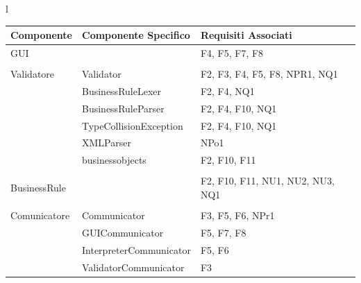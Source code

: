 \documentclass[11pt,titlepage,a4paper]{report}
\begin{document}
\begin{center}
\begin{table}[hbtp]
\large{
\begin{tabular}{l}
\begin{tabular}{||p{3cm}||p{5cm}||p{6cm}||} \hline \hline
\textbf{Componente} & \textbf{Componente Specifico} & \textbf{Requisiti Associati} \\ \hline

GUI & & F4, F5, F7, F8\\ \hline
 &  & \\ \hline

Validatore & Validator & F2, F3, F4, F5, F8, NPR1, NQ1\\ \hline
 & BusinessRuleLexer & F2, F4, NQ1 \\ \hline
 & BusinessRuleParser & F2, F4, F10, NQ1 \\ \hline
 & TypeCollisionException & F2, F4, F10, NQ1\\ \hline
 & XMLParser & NPo1\\ \hline
 & businessobjects & F2, F10, F11\\ \hline
 &  & \\ \hline

BusinessRule & & F2, F10, F11, NU1, NU2, NU3, NQ1\\ \hline
 &  & \\ \hline

Comunicatore & Communicator & F3, F5, F6, NPr1\\ \hline
 & GUICommunicator & F5, F7, F8\\ \hline
 & InterpreterCommunicator & F5, F6\\ \hline
 & ValidatorCommunicator & F3\\ \hline


\end{tabular} \\
\end{tabular}

}
\end{table}
\end{center}
\end{document}
